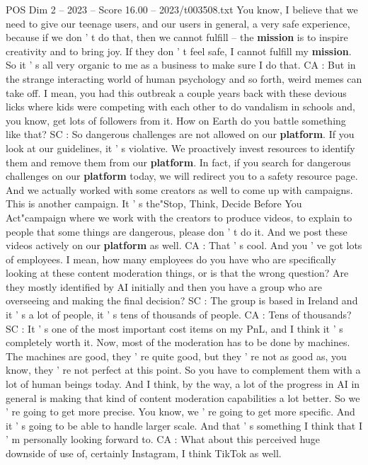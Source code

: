 \begin{textsample}{POS Dim 2 – 2023 – Score 16.00 – 2023/t003508.txt}
You know, I believe that we need to give our teenage users, and our users in general, a very safe experience, because if we don ' t do that, then we cannot fulfill -- the \textbf{mission} is to inspire creativity and to bring joy.
If they don ' t feel safe, I cannot fulfill my \textbf{mission}.
So it ' s all very organic to me as a business to make sure I do that.
CA : But in the strange interacting world of human psychology and so forth, weird memes can take off.
I mean, you had this outbreak a couple years back with these devious licks where kids were competing with each other to do vandalism in schools and, you know, get lots of followers from it.
How on Earth do you battle something like that?
SC : So dangerous challenges are not allowed on our \textbf{platform}.
If you look at our guidelines, it ' s violative.
We proactively invest resources to identify them and remove them from our \textbf{platform}.
In fact, if you search for dangerous challenges on our \textbf{platform} today, we will redirect you to a safety resource page.
And we actually worked with some creators as well to come up with campaigns.
This is another campaign.
It ' s the"Stop, Think, Decide Before You Act"campaign where we work with the creators to produce videos, to explain to people that some things are dangerous, please don ' t do it.
And we post these videos actively on our \textbf{platform} as well.
CA : That ' s cool.
And you ' ve got lots of employees.
I mean, how many employees do you have who are specifically looking at these content moderation things, or is that the wrong question?
Are they mostly identified by AI initially and then you have a group who are overseeing and making the final decision?
SC : The group is based in Ireland and it ' s a lot of people, it ' s tens of thousands of people.
CA : Tens of thousands?
SC : It ' s one of the most important cost items on my PnL, and I think it ' s completely worth it.
Now, most of the moderation has to be done by machines.
The machines are good, they ' re quite good, but they ' re not as good as, you know, they ' re not perfect at this point.
So you have to complement them with a lot of human beings today.
And I think, by the way, a lot of the progress in AI in general is making that kind of content moderation capabilities a lot better.
So we ' re going to get more precise.
You know, we ' re going to get more specific.
And it ' s going to be able to handle larger scale.
And that ' s something I think that I ' m personally looking forward to.
CA : What about this perceived huge downside of use of, certainly Instagram, I think TikTok as well.

\end{textsample}
